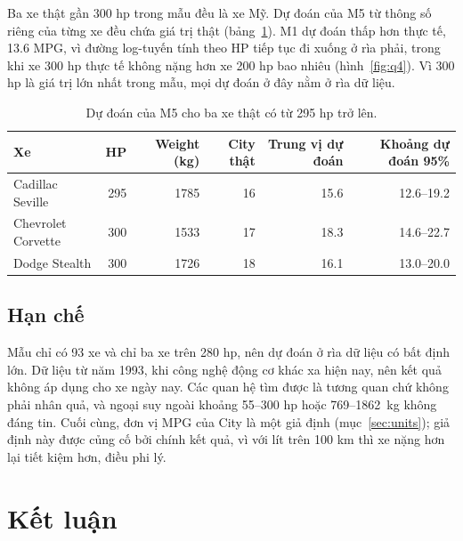 \documentclass[12pt,a4paper]{report}
\begin{document}
Ba xe thật gần 300 hp trong mẫu đều là xe Mỹ. Dự đoán của M5 từ thông số riêng
của từng xe đều chứa giá trị thật (bảng~\ref{tab:q4-real}). M1 dự đoán thấp hơn
thực tế, \num{13.6} MPG, vì đường log-tuyến tính theo HP tiếp tục đi xuống ở rìa
phải, trong khi xe 300 hp thực tế không nặng hơn xe 200 hp bao nhiêu
(hình~\ref{fig:q4}). Vì 300 hp là giá trị lớn nhất trong mẫu, mọi dự đoán ở đây
nằm ở rìa dữ liệu.

\begin{table}[tp]
  \centering
  \caption{Dự đoán của M5 cho ba xe thật có từ 295 hp trở lên.}
  \label{tab:q4-real}
  \begin{tabular}{lrrrrr}
    \toprule
    Xe & HP & Weight (kg) & City thật & Trung vị dự đoán & Khoảng dự đoán 95\% \\
    \midrule
    Cadillac Seville   & 295 & \num{1785} & 16 & \num{15.6} & \num{12.6}--\num{19.2} \\
    Chevrolet Corvette & 300 & \num{1533} & 17 & \num{18.3} & \num{14.6}--\num{22.7} \\
    Dodge Stealth      & 300 & \num{1726} & 18 & \num{16.1} & \num{13.0}--\num{20.0} \\
    \bottomrule
  \end{tabular}
\end{table}


\section{Hạn chế}

Mẫu chỉ có 93 xe và chỉ ba xe trên 280 hp, nên dự đoán ở rìa dữ liệu có bất định
lớn. Dữ liệu từ năm 1993, khi công nghệ động cơ khác xa hiện nay, nên kết quả
không áp dụng cho xe ngày nay. Các quan hệ tìm được là tương quan chứ không phải
nhân quả, và ngoại suy ngoài khoảng 55--300 hp hoặc
769--\SI{1862}{kg} không đáng tin. Cuối cùng, đơn vị MPG của City là một giả
định (mục~\ref{sec:units}); giả định này được củng cố bởi chính kết quả, vì với
lít trên 100 km thì xe nặng hơn lại tiết kiệm hơn, điều phi lý.

\chapter{Kết luận}
\label{sec:conclusion}
\end{document}
